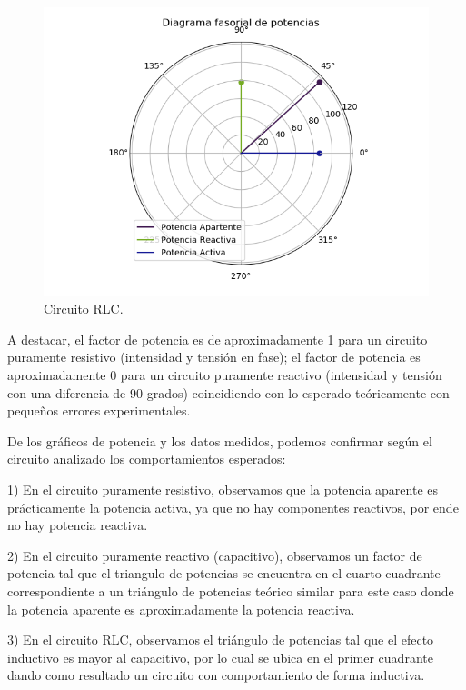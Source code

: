 \documentclass[a4paper]{article}
\begin{document}
\begin{figure}[H]
\begin{minipage}{.5\textwidth}
\end{minipage}\\
\begin{minipage}{.5\textwidth}
  \centering
  \includegraphics[width=1.2\linewidth]{Diag-Fas-2C}
  \caption{Circuito RLC.}
\end{minipage}
\end{figure}
 A destacar, el factor de potencia es de aproximadamente 1 para un circuito puramente resistivo (intensidad y tensión en fase); el factor de potencia es aproximadamente 0 para un circuito puramente reactivo (intensidad y tensión con una diferencia de 90 grados) coincidiendo con lo esperado teóricamente con pequeños errores experimentales.
 
 De los gráficos de potencia y los datos medidos, podemos confirmar según el circuito analizado los comportamientos esperados: 
 
 1) En el circuito puramente resistivo, observamos que la potencia aparente es prácticamente la potencia activa, ya que no hay componentes reactivos, por ende no hay potencia reactiva. 
 
 2) En el circuito puramente reactivo (capacitivo), observamos un factor de potencia tal que el triangulo de potencias se encuentra en el cuarto cuadrante correspondiente a un triángulo de potencias teórico similar para este caso donde la potencia aparente es aproximadamente la potencia reactiva.
 
 3) En el circuito RLC, observamos el triángulo de potencias tal que el efecto inductivo es mayor al capacitivo, por lo cual se ubica en el primer cuadrante dando como resultado un circuito con comportamiento de forma inductiva. 
\end{document}
